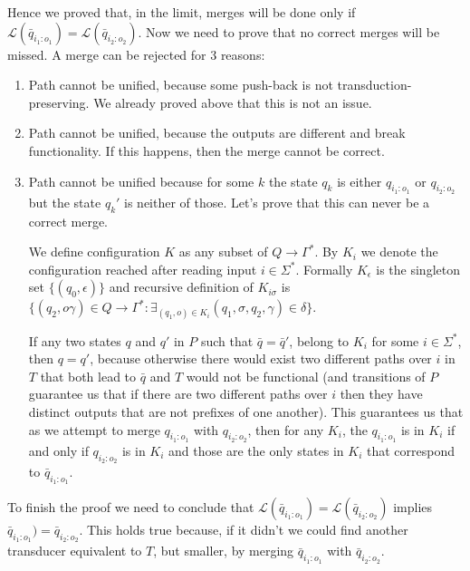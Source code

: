 Hence we proved that, in the limit, merges will be done only if $\mathcal{L}(\bar{q}_{i_1:o_1})=\mathcal{L}(\bar{q}_{i_2:o_2})$. Now we need to prove that no correct merges will be missed. A merge can be rejected for 3 reasons:

\begin{enumerate}
	\item Path cannot be unified, because some push-back is not transduction-preserving. We already proved above that this is not an issue.
	\item Path cannot be unified, because the outputs are different and break functionality. If this happens, then the merge cannot be correct.
	\item Path cannot be unified because for some $k$ the state $q_k$ is either  $q_{i_1:o_1}$ or $q_{i_2:o_2}$ but the state  $q_k'$ is neither of those. Let's prove that this can never be a correct merge.
	
	We define configuration $K$ as any subset of $Q \rightarrow \Gamma^*$. By $K_i$ we denote the configuration reached after reading input $i\in\Sigma^*$. Formally $K_\epsilon$ is the singleton set $\{(q_0,\epsilon)\}$ and recursive definition of $K_{i \sigma}$ is $\{(q_2,o\gamma) \in  Q \rightarrow \Gamma^* : \exists_{(q_1,o)\in K_i} (q_1,\sigma,q_2,\gamma)\in\delta \}$. 
	
	If any two states $q$ and $q'$ in $P$ such that $\bar{q}=\bar{q}'$,  belong to $K_i$ for some $i\in\Sigma^*$,  then $q=q'$, because otherwise there would exist two different paths over $i$ in $T$ that both lead to $\bar{q}$ and $T$ would not be functional (and transitions of $P$ guarantee us that if there are two different paths over $i$ then they have distinct outputs that are not prefixes of one another). This guarantees us that as we attempt to merge $q_{i_1:o_1}$ with $q_{i_2:o_2}$, then for any $K_i$, the $q_{i_1:o_1}$ is in $K_i$ if and only if $q_{i_2:o_2}$ is in $K_i$ and those are the only states in $K_i$ that correspond to $\bar{q}_{i_1:o_1}$. 
	
\end{enumerate}

To finish the proof we need to conclude that $\mathcal{L}(\bar{q}_{i_1:o_1})=\mathcal{L}(\bar{q}_{i_2:o_2})$ implies $\bar{q}_{i_1:o_1})=\bar{q}_{i_2:o_2}$. This holds true because, if it didn't we could find another transducer equivalent to $T$, but smaller, by merging $\bar{q}_{i_1:o_1}$ with $\bar{q}_{i_2:o_2}$.






